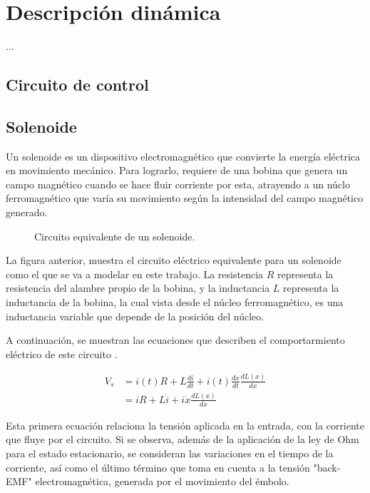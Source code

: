 \documentclass[journal]{IEEEtran}
\begin{document}
\section{Descripción dinámica}

...

\subsection{Circuito de control}

\subsection{Solenoide}
Un solenoide es un dispositivo electromagnético que convierte la energía eléctrica en movimiento mecánico. Para lograrlo, 
requiere de una bobina que genera un campo magnético cuando se hace fluir corriente por esta, atrayendo a un núclo ferromagnético
que varía su movimiento según la intensidad del campo magnético generado. 


\begin{figure}[H]
  \centering
  \caption{Circuito equivalente de un solenoide.}
  \label{fig:circuito_solenoide}
\end{figure}

La figura anterior, muestra el circuito eléctrico equivalente para un solenoide como el que se va a modelar
en este trabajo. La resistencia $R$ representa la resistencia del alambre propio de la bobina, y la inductancia $L$
representa la inductancia de la bobina, la cual vista desde el núcleo ferromagnético, 
es una inductancia variable que depende de la posición del núcleo.

\setlength{\parskip}{1em}

A continuación, se muestran las ecuaciones que describen el comportarmiento 
eléctrico de este circuito \cite{Alexander2018}.

\begin{equation}
\begin{aligned}
    V_s &= i(t)R + L \frac{di}{dt} + i(t) \frac{dx}{dt} \frac{dL(x)}{dx} \\
        &= iR + L \dot{i} + i \dot{x} \frac{dL(x)}{dx}
\end{aligned}
\label{eq:eléctrica_solenoide}
\end{equation}

Esta primera ecuación relaciona la tensión aplicada en la entrada, con la corriente que fluye 
por el circuito. Si se observa, además de la aplicación de la ley de Ohm para el estado estacionario,
se consideran las variaciones en el tiempo de la corriente, así como el último término que toma en cuenta 
a la tensión "back-EMF" electromagnética, generada por el movimiento del émbolo.
\end{document}
